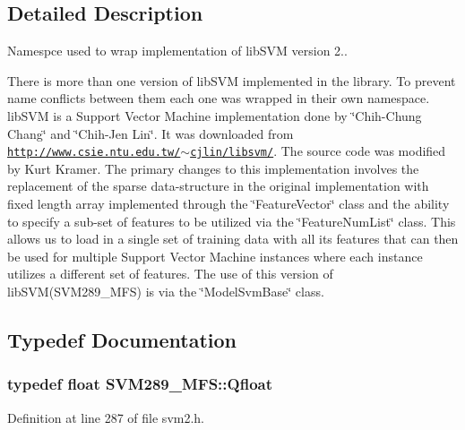 \subsection{Detailed Description}
Namespce used to wrap implementation of lib\+S\+VM version 2.. 

There is more than one version of lib\+S\+VM implemented in the library. To prevent name conflicts between them each one was wrapped in their own namespace. ~\newline
 lib\+S\+VM is a Support Vector Machine implementation done by \char`\"{}\+Chih-\/\+Chung Chang\char`\"{} and \char`\"{}\+Chih-\/\+Jen Lin\char`\"{}. It was downloaded from \href{http://www.csie.ntu.edu.tw/~cjlin/libsvm/}{\tt http\+://www.\+csie.\+ntu.\+edu.\+tw/$\sim$cjlin/libsvm/}. The source code was modified by Kurt Kramer. The primary changes to this implementation involves the replacement of the sparse data-\/structure in the original implementation with fixed length array implemented through the \char`\"{}\+Feature\+Vector\char`\"{} class and the ability to specify a sub-\/set of features to be utilized via the \char`\"{}\+Feature\+Num\+List\char`\"{} class. This allows us to load in a single set of training data with all its features that can then be used for multiple Support Vector Machine instances where each instance utilizes a different set of features. The use of this version of lib\+S\+V\+M(\+S\+V\+M289\+\_\+\+M\+F\+S) is via the \char`\"{}\+Model\+Svm\+Base\char`\"{} class. 

\subsection{Typedef Documentation}
\subsubsection[{\texorpdfstring{Qfloat}{Qfloat}}]{\setlength{\rightskip}{0pt plus 5cm}typedef float {\bf S\+V\+M289\+\_\+\+M\+F\+S\+::\+Qfloat}}\hypertarget{namespace_s_v_m289___m_f_s_a440663a1b8d42bc10329401883645ae1}{}\label{namespace_s_v_m289___m_f_s_a440663a1b8d42bc10329401883645ae1}


Definition at line 287 of file svm2.\+h.

